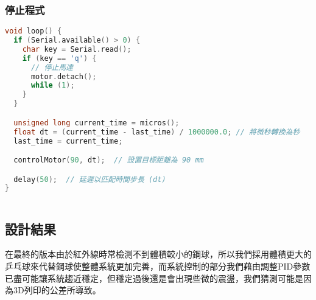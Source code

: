 \subsubsection{停止程式}
\begin{lstlisting}[language=C]
void loop() {
  if (Serial.available() > 0) {
    char key = Serial.read();
    if (key == 'q') {
      // 停止馬達
      motor.detach();
      while (1);
    }
  }

  unsigned long current_time = micros();
  float dt = (current_time - last_time) / 1000000.0; // 將微秒轉換為秒
  last_time = current_time;

  controlMotor(90, dt);  // 設置目標距離為 90 mm

  delay(50);  // 延遲以匹配時間步長 (dt)
}
  
\end{lstlisting}

\subsection{設計結果}
在最終的版本由於紅外線時常檢測不到體積較小的鋼球，所以我們採用體積更大的乒乓球來代替鋼球使整體系統更加完善，而系統控制的部分我們藉由調整PID參數已盡可能讓系統趨近穩定，但穩定過後還是會出現些微的震盪，我們猜測可能是因為3D列印的公差所導致。



